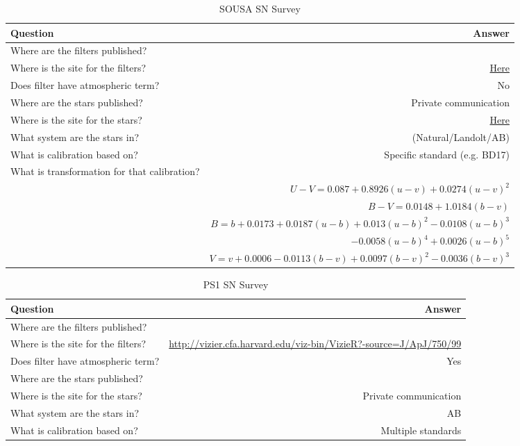 \documentclass[twocolumn]{aastex63}
\begin{document}
\begin{table}
\label{table:information}
\caption{\large SOUSA SN Survey}
\begin{tabular}{lr}
\toprule
    Question & Answer \\
\hline

Where are the filters published? & \cite{brown14} \\
Where is the site for the filters? & \href{https://ui.adsabs.harvard.edu/abs/2011AIPC.1358..373B/abstract}{Here} \\
Does filter have atmospheric term?	& No \\
Where are the stars published? & Private communication \\
Where is the site for the stars? & \href{http://vizier.cfa.harvard.edu/viz-bin/VizieR-3?-source=J/ApJS/190/418/table7}{Here} \\
What system are the stars in? & (Natural/Landolt/AB) \\
What is calibration based on? & Specific standard (e.g. BD17) \\
What is transformation for that calibration? & ~\\
~& $U-V = 0.087+0.8926(u-v)+0.0274(u-v)^2$ \\
~ & $B-V = 0.0148+1.0184(b-v)$ \\
~ & $B = b+0.0173+0.0187(u-b)+0.013(u-b)^2-0.0108(u-b)^3$\\
~ & $-0.0058(u-b)^4+0.0026(u-b)^5$ \\
~ & $V = v+0.0006-0.0113(b-v)+0.0097(b-v)^2-0.0036(b-v)^3$ \\
\end{tabular}
\end{table}


\begin{table}
\label{table:information}
\caption{\large PS1 SN Survey}
\begin{tabular}{lr}
\toprule
    Question & Answer \\
\hline

Where are the filters published? & \cite{PS1} \\
Where is the site for the filters? & \href{http://vizier.cfa.harvard.edu/viz-bin/VizieR?-source=J/ApJ/750/99}{http://vizier.cfa.harvard.edu/viz-bin/VizieR?-source=J/ApJ/750/99} \\
Does filter have atmospheric term?	& Yes \\
Where are the stars published? & \cite{Scolnic18}\\
Where is the site for the stars? & Private communication \\
What system are the stars in? & AB \\
What is calibration based on? & Multiple standards \\
\end{tabular}
\end{table}
\end{document}
